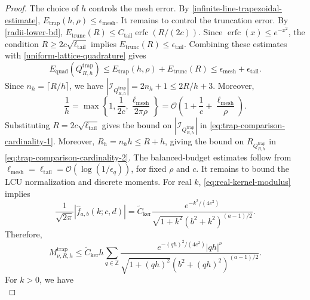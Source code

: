 \documentclass[10pt,reqno]{article}
\numberwithin{equation}{section}
\theoremstyle{plain}
\theoremstyle{definition}
\begin{document}
\begin{proof}
The choice of \(h\) controls the mesh error. By \cref{infinite-line-trapezoidal-estimate}, \(E_{\operatorname{trap}}(h,\rho)\le \epsilon_{\operatorname{mesh}}\). It remains to control the truncation error. By \cref{radii-lower-bd}, \(E_{\operatorname{trunc}}(R)\le C_{\operatorname{tail}}\operatorname{erfc}(R/(2c))\). Since \(\operatorname{erfc}(x)\le e^{-x^2}\), the condition \(R\ge 2c\sqrt{\ell_{\operatorname{tail}}}\) implies \(E_{\operatorname{trunc}}(R)\le \epsilon_{\operatorname{tail}}\). Combining these estimates with \cref{uniform-lattice-quadrature} gives
\begin{equation}
E_{\operatorname{quad}}(Q_{R,h}^{\operatorname{trap}})\le E_{\operatorname{trap}}(h,\rho)+E_{\operatorname{trunc}}(R)\le \epsilon_{\operatorname{mesh}}+\epsilon_{\operatorname{tail}}.
\end{equation}
Since \(n_h=\lceil R/h\rceil\), we have \(|\mathcal I_{Q_{R,h}^{\operatorname{trap}}}|=2n_h+1\le 2R/h+3\). Moreover,
\begin{equation}
\frac1h = \max\left\{1,\frac1{2c},\frac{\ell_{\operatorname{mesh}}}{2\pi\rho}\right\} = \mathcal O\left(1+\frac1c+\frac{\ell_{\operatorname{mesh}}}{\rho}\right).
\end{equation}
Substituting \(R=2c\sqrt{\ell_{\operatorname{tail}}}\) gives the bound on \(|\mathcal I_{Q_{R,h}^{\operatorname{trap}}}|\) in \cref{eq:trap-comparison-cardinality-1}. Moreover, \(R_h=n_hh\le R+h\), giving the bound on \(R_{Q_{R,h}^{\operatorname{trap}}}\) in \cref{eq:trap-comparison-cardinality-2}. The balanced-budget estimates follow from \(\ell_{\operatorname{mesh}}=\ell_{\operatorname{tail}}=\mathcal O(\log(1/\epsilon_q))\), for fixed \(\rho\) and \(c\). It remains to bound the LCU normalization and discrete moments. For real \(k\), \cref{eq:real-kernel-modulus} implies
\begin{equation}\label{eq:kernel-sharp-majorant}
\frac{1}{\sqrt{2\pi}}|\hat f_{a,b}(k;c,d)| = \widetilde C_{\operatorname{ker}}\frac{e^{-k^2/(4c^2)}}{\sqrt{1+k^2}(b^2+k^2)^{(a-1)/2}}.
\end{equation}
Therefore,
\begin{equation}\label{eq:trap-moment-sharp-start}
M_{\nu,R,h}^{\operatorname{trap}}\le \widetilde C_{\operatorname{ker}}h\sum_{q\in\mathbb Z}\frac{e^{-(qh)^2/(4c^2)}|qh|^\nu}{\sqrt{1+(qh)^2}(b^2+(qh)^2)^{(a-1)/2}}.
\end{equation}
For \(k>0\), we have
\begin{equation}\label{eq:trap-denom-min-bound}

\end{equation}
\end{proof}
\end{document}

